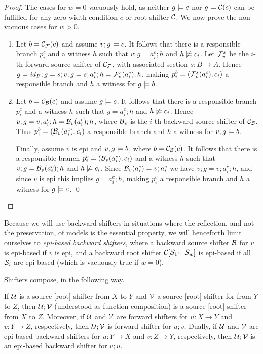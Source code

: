 \begin{proof}
The cases for $w=0$ vacuously hold, as neither $g\models c$ nor $g\models \mathcal{C}(c)$ can be fulfilled for any zero-width condition $c$ or root shifter $\mathcal{C}$. We now prove the non-vacuous cases for $w > 0$.
\begin{enumerate}
\item Let $b=\mathcal{C}_{\mathcal{F}}(c)$ and assume $v;g\models c$. It follows that there is a responsible branch $p^c_i$ and a witness $h$ such that $v;g=a^c_i;h$ and $h\not\models c_i$. Let $\mathcal{F}_v^s$ be the $i$-th forward source shifter of $\mathcal{C}_{\mathcal{F}}$, with associated section $s: B\to A$. Hence $g=\mathit{id}_B;g=s;v;g=s;a^c_i;h=\mathcal{F}_v^s(a^c_i);h$, making $p^b_i=(\mathcal{F}_v^s(a^c_i),c_i)$ a responsible branch and $h$ a witness for $g\models b$.

\item Let $b=\mathcal{C}_{\mathcal{B}}(c)$ and assume $g\models c$. It follows that there is a responsible branch $p^c_i$ and a witness $h$ such that $g=a^c_i;h$ and $h\not\models c_i$. Hence $v;g=v;a^c_i;h=\mathcal{B}_v(a^c_i);h$, where $\mathcal{B}_v$ is the $i$-th backward source shifter of $\mathcal{C}_{\mathcal{B}}$. Thus $p^b_i=(\mathcal{B}_v(a^c_i),c_i)$ a responsible branch and $h$ a witness for $v;g\models b$.

\smallskip
Finally, assume $v$ is epi and $v;g\models b$, where $b = \mathcal{C}_{\mathcal{B}}(c)$. It follows that there is a responsible branch $p^b_i=(\mathcal{B}_v(a^c_i),c_i)$ and a witness $h$ such that $v;g=\mathcal{B}_v(a^c_i);h$ and $h\not\models c_i$. Since $\mathcal{B}_v(a^c_i)=v;a^c_i$ we have $v;g=v;a^c_i;h$, and since $v$ is epi this implies $g=a^c_i;h$, making $p^c_i$ a responsible branch and $h$ a witness for $g\models c$.
\qed
\end{enumerate}
\end{proof}
%
Because we will use backward shifters in situations where the reflection, and not the preservation, of models is the essential property, we will henceforth limit ourselves to \emph{epi-based backward shifters}, where a backward source shifter $\mathcal{B}$ for $v$ is epi-based if $v$ is epi, and a backward root shifter $\mathcal{C}[\mathcal{S}_1{\cdotp\mkern-2mu\cdotp\mkern-2mu\cdotp\mkern1mu} \mathcal{S}_w]$ is epi-based if all $\mathcal{S}_i$ are epi-based (which is vacuously true if $w=0$).

Shifters compose, in the following way.
%
\begin{proposition}
If $\mathcal{U}$ is a source [root] shifter from $X$ to $Y$ and $\mathcal{V}$ a source [root] shifter for from $Y$ to $Z$, then $\mathcal{U};\mathcal{V}$ (understood as function composition) is a source [root] shifter from $X$ to $Z$. Moreover, if $\mathcal{U}$ and $\mathcal{V}$ are forward shifters for $u: X\to Y$ and $v: Y \to Z$, respectively, then $\mathcal{U};\mathcal{V}$ is forward shifter for $u;v$. Dually, if $\mathcal{U}$ and $\mathcal{V}$ are epi-based backward shifters for $u: Y\to X$ and $v: Z \to Y$, respectively, then $\mathcal{U};\mathcal{V}$ is an epi-based backward shifter for $v;u$.
\end{proposition}

